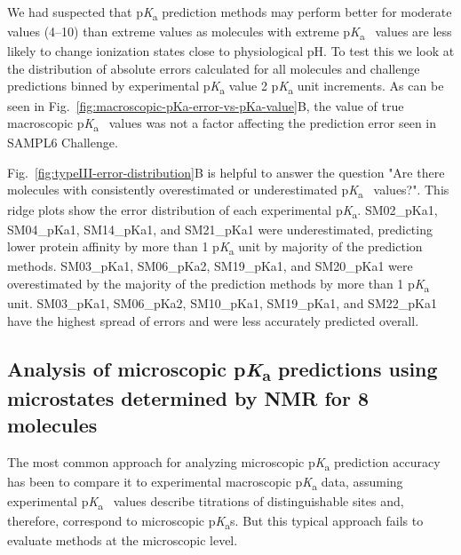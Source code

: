 \documentclass[9pt,lineno,final]{elife}
\newcommand{\pKa}{p\textit{K}\textsubscript{a}}
\begin{document}
We had suspected that \pKa{} prediction methods may perform better for moderate values (4--10) than extreme values as molecules with extreme \pKa{}~ values are less likely to change ionization states close to physiological pH. 
To test this we look at the distribution of absolute errors calculated for all molecules and challenge predictions binned by experimental \pKa{} value 2 \pKa{} unit increments. 
As can be seen in Fig.~\ref{fig:macroscopic-pKa-error-vs-pKa-value}B, the value of true macroscopic \pKa{}~ values was not a factor affecting the prediction error seen in SAMPL6 Challenge.

Fig.~\ref{fig:typeIII-error-distribution}B is helpful to answer the question "Are there molecules with consistently overestimated or underestimated \pKa{}~ values?". 
This ridge plots show the error distribution of each experimental \pKa{}. 
SM02\_pKa1, SM04\_pKa1, SM14\_pKa1, and SM21\_pKa1 were underestimated, predicting lower protein affinity by more than 1 \pKa{} unit by majority of the prediction methods. 
SM03\_pKa1, SM06\_pKa2, SM19\_pKa1, and SM20\_pKa1 were overestimated by the majority of the prediction methods by more than 1 \pKa{} unit.
SM03\_pKa1, SM06\_pKa2, SM10\_pKa1, SM19\_pKa1, and SM22\_pKa1 have the highest spread of errors and were less accurately predicted overall. 



\subsection{Analysis of microscopic \pKa{} predictions using microstates determined by NMR for 8 molecules}

The most common approach for analyzing microscopic \pKa{} prediction accuracy has been to compare it to experimental macroscopic \pKa{} data, assuming experimental \pKa{}~ values describe titrations of distinguishable sites and, therefore, correspond to microscopic \pKa{}s. 
But this typical approach fails to evaluate methods at the microscopic level.
\end{document}
